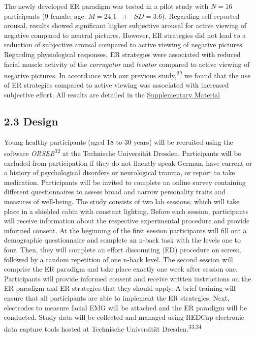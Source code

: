 \documentclass[
  english,
  man,floatsintext]{apa6}
\begin{document}
The newly developed ER paradigm was tested in a pilot study with \(N=16\) participants (9 female; age: \(M = 24.1\text{ }\pm\text{ }SD = 3.6\)).
Regarding self-reported arousal, results showed significant higher subjective arousal for active viewing of negative compared to neutral pictures.
However, ER strategies did not lead to a reduction of subjective arousal compared to active viewing of negative pictures.
Regarding physiological responses, ER strategies were associated with reduced facial muscle activity of the \emph{corrugator} and \emph{levator} compared to active viewing of negative pictures.
In accordance with our previous study,\textsuperscript{22} we found that the use of ER strategies compared to active viewing was associated with increased subjective effort.
All results are detailed in the \protect\hyperlink{SupplementaryMaterial}{Supplementary Material}

\hypertarget{design}{%
\subsection{2.3 Design}\label{design}}

Young healthy participants (aged 18 to 30 years) will be recruited using the software \emph{ORSEE}\textsuperscript{32} at the Technische Universität Dresden.
Participants will be excluded from participation if they do not fluently speak German, have current or a history of psychological disorders or neurological trauma, or report to take medication.
Participants will be invited to complete an online survey containing different questionnaires to assess broad and narrow personality traits and measures of well-being.
The study consists of two lab sessions, which will take place in a shielded cabin with constant lighting.
Before each session, participants will receive information about the respective experimental procedure and provide informed consent.
At the beginning of the first session participants will fill out a demographic questionnaire and complete an n-back task with the levels one to four.
Then, they will complete an effort discounting (ED) procedure on screen, followed by a random repetition of one n-back level.
The second session will comprise the ER paradigm and take place exactly one week after session one.
Participants will provide informed consent and receive written instructions on the ER paradigm and ER strategies that they should apply.
A brief training will ensure that all participants are able to implement the ER strategies.
Next, electrodes to measure facial EMG will be attached and the ER paradigm will be conducted.
Study data will be collected and managed using REDCap electronic data capture tools hosted at Technische Universität Dresden.\textsuperscript{33,34}
\end{document}
